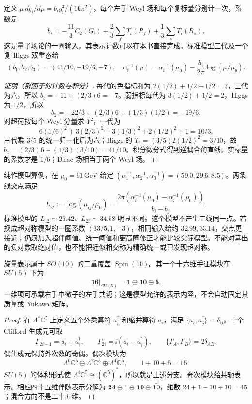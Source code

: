 \begin{proposition}[一圈群因子与三条耦合直线]
定义 $\mu\,dg_i/d\mu=b_i g_i^3/(16\pi^2)$。每个左手 Weyl 场和每个复标量分别计一次，系数是
\[
 b_i=-\frac{11}{3}C_2(G_i)+\frac23\sum_fT_i(R_f)+\frac13\sum_sT_i(R_s).
\]
这是量子场论的一圈输入，其表示计数可以在本书直接完成。标准模型三代及一个复 Higgs 双重态给
\[
 (b_1,b_2,b_3)=(41/10,-19/6,-7),\quad
 \alpha_i^{-1}(\mu)=\alpha_i^{-1}(\mu_0)-\frac{b_i}{2\pi}\log(\mu/\mu_0).
\]
\end{proposition}
\begin{proof}[证明（群因子的计数与积分）]
每代的色指标和为 $2(1/2)+1/2+1/2=2$，三代为六，所以 $b_3=-11+(2/3)6=-7$。弱指标每代为 $3(1/2)+1/2=2$，Higgs 为 $1/2$，所以
\[
 b_2=-22/3+(2/3)6+(1/3)(1/2)=-19/6.
\]
对超荷按每个 Weyl 分量求 $Y^2$，一代为
\[
 6(1/6)^2+3(2/3)^2+3(1/3)^2+2(1/2)^2+1=10/3.
\]
三代乘 $3/5$ 的统一归一化后为六；Higgs 的 $T_1=(3/5)2(1/2)^2=3/10$，故 $b_1=(2/3)6+(1/3)(3/10)=41/10$。积分微分式得到逆耦合的直线。实标量的系数才是 $1/6$；Dirac 场相当于两个 Weyl 场。
\end{proof}

\begin{workedexample}
纯作模型算例，在 $\mu_0=91\,\mathrm{GeV}$ 给定 $(\alpha_1^{-1},\alpha_2^{-1},\alpha_3^{-1})=(59.0,29.6,8.5)$。两条线交点满足
\[
 L_{ij}:=\log(\mu_{ij}/\mu_0)=\frac{2\pi(\alpha_i^{-1}(\mu_0)-\alpha_j^{-1}(\mu_0))}{b_i-b_j}.
\]
标准模型的 $L_{12}\simeq25.42$、$L_{23}\simeq34.58$ 明显不同。这个模型不产生三线同一点。若换成超对称模型的一圈系数 $(33/5,1,-3)$，相同输入给约 $32.99,33.14$，交点更接近；仍须加入超伴阈值、统一阈值和更高圈修正才能比较实际模型。不能对算出的负对数取绝对值，也不能把近似相交称为精确统一或已发现超对称。
\end{workedexample}

\begin{theorem}
旋量表示属于 $SO(10)$ 的二重覆盖 $\operatorname{Spin}(10)$。其一个十六维手征模块在 $SU(5)$ 下为
\begin{equation}
 \mathbf{16}\big|_{SU(5)}=\mathbf1\oplus\mathbf{10}\oplus\bar{\mathbf5}.
 \label{eq:so10-spinor-branch}
\end{equation}
一维项可承载右手中微子的左手共轭；这是模型允许的表示内容，不会自动固定其质量或 Yukawa 矩阵。
\end{theorem}
\begin{proof}
在 $\Lambda^*\mathbb C^5$ 上定义五个外乘算符 $a_i^\dagger$ 和缩并算符 $a_i$，满足 $\{a_i,a_j^\dagger\}=\delta_{ij}$。十个 Clifford 生成元可取
\[
 \Gamma_{2i-1}=a_i+a_i^\dagger,\qquad
 \Gamma_{2i}=\ii(a_i-a_i^\dagger),\qquad \{\Gamma_A,\Gamma_B\}=2\delta_{AB}.
\]
偶生成元保持外次数的奇偶。偶次模块为
\[
 \Lambda^0\mathbb C^5\oplus\Lambda^2\mathbb C^5\oplus\Lambda^4\mathbb C^5,
 \qquad 1+10+5=16.
\]
$SU(5)$ 的体积形式使 $\Lambda^4\mathbb C^5\cong(\mathbb C^5)^*$，所以就是上述分支。奇次模块给共轭表示。相应四十五维伴随表示分解为 $\mathbf{24}\oplus\mathbf1\oplus\mathbf{10}\oplus\bar{\mathbf{10}}$，维数 $24+1+10+10=45$；混合方向不是二十五维。
\end{proof}

